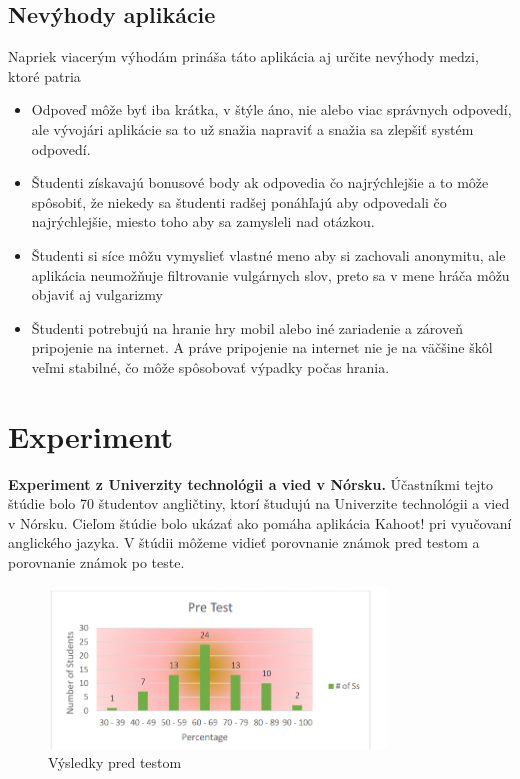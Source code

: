 \documentclass[10pt,oneside,slovak,a4paper]{article}
\begin{document}
\subsection{Nevýhody aplikácie}
Napriek viacerým výhodám prináša táto aplikácia aj určite nevýhody medzi, ktoré patria
\begin{itemize}
\item	Odpoveď môže byť iba krátka, v štýle áno, nie alebo viac správnych odpovedí, ale vývojári aplikácie sa to už snažia napraviť a snažia sa zlepšiť systém odpovedí. \cite{Lauren}
\item	Študenti získavajú bonusové body ak odpovedia čo najrýchlejšie a to môže spôsobiť, že niekedy sa študenti radšej ponáhľajú aby odpovedali čo najrýchlejšie, miesto toho aby sa zamysleli nad otázkou.\cite{Lauren}
\item	Študenti si síce môžu vymyslieť vlastné meno aby si zachovali anonymitu, ale aplikácia neumožňuje filtrovanie vulgárnych slov, preto sa v mene hráča môžu objaviť aj vulgarizmy \cite{nevyhoda}
\item	Študenti potrebujú na hranie hry mobil alebo iné zariadenie a zároveň pripojenie na internet. A práve pripojenie na internet nie je na väčšine škôl veľmi stabilné, čo môže spôsobovať výpadky počas hrania. \cite{nevyhoda}


\end {itemize}

\section{Experiment} \label{dolezita}
\textbf {Experiment z Univerzity technológii a vied v Nórsku.\cite{medina2017}} Účastníkmi tejto štúdie bolo 70 študentov angličtiny, ktorí študujú na Univerzite technológii a vied v Nórsku. Cieľom štúdie bolo ukázať ako pomáha aplikácia Kahoot! pri vyučovaní anglického jazyka. V štúdii môžeme vidieť porovnanie známok pred testom a porovnanie známok po teste. 
\begin{figure}[h] %
\centering
\includegraphics[width=9cm]{Predtestom.png}
\caption{
Výsledky pred testom\cite{medina2017}
}
\end{figure}
\end{document}
